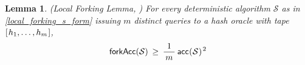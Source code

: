 \documentclass[10pt, psamsfonts, reqno]{amsart}
\newtheorem{lem}[thm]{Lemma}
\theoremstyle{definition}
\theoremstyle{remark}
\numberwithin{equation}{section}
\begin{document}
\begin{lem}\label{local_forking_lemma}
\textup{(\textit{Local Forking Lemma}, \cite{paper_bellare_local_forking})}
For every deterministic algorithm $\mathcal{S}$ as in
\eqref{local_forking_s_form} issuing $m$ distinct queries
to a hash oracle with tape
$[\hspace{0.75pt}h_1, \dots, h_{m}\hspace{0.75pt}]$,
\vspace{5pt}
\begin{equation}\label{local_forking_bound}
\mathsf{forkAcc}
	(
		\mathcal{S}
	)
	\hspace{2pt}
	\ge
	\hspace{2pt}
	\frac{1}{\hspace{2pt}m\hspace{2pt}}
	\hspace{2pt}
	\mathsf{acc}
	\hspace{0.3pt}
	(
		\hspace{0.3pt}
		\mathcal{S}
		\hspace{0.3pt}
	) ^ {\hspace{1pt}2}
\vspace{5pt}
\end{equation}
\end{lem}
\end{document}
